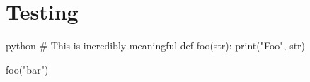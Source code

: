 \documentclass{article}
\begin{document}
    \section{Testing}

    \lipsum[5]

    \begin{mintedbox}{python}
# This is incredibly meaningful
def foo(str):
    print("Foo", str)

foo("bar")
    \end{mintedbox}

    \lipsum[1-20]
\end{document}
